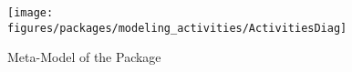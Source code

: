 %
%

\begin{figure}[htbp]
  \centering
  \texttt{[image: figures/packages/modeling\_activities/ActivitiesDiag]}
  \caption{Meta-Model of the  Package}
  \label{fig:MM:activities}
\end{figure}
